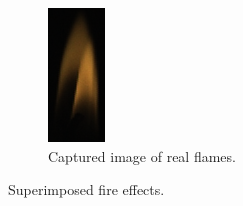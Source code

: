 \begin{figure}[htpb]
        \begin{subfigure}[t]{0.15\textwidth}
                \includegraphics[width=\textwidth]{img/vox0087}
                \caption{Captured image of real flames.}
                \label{fig:vox0087}
        \end{subfigure}
        \caption{Superimposed fire effects.}
\end{figure}